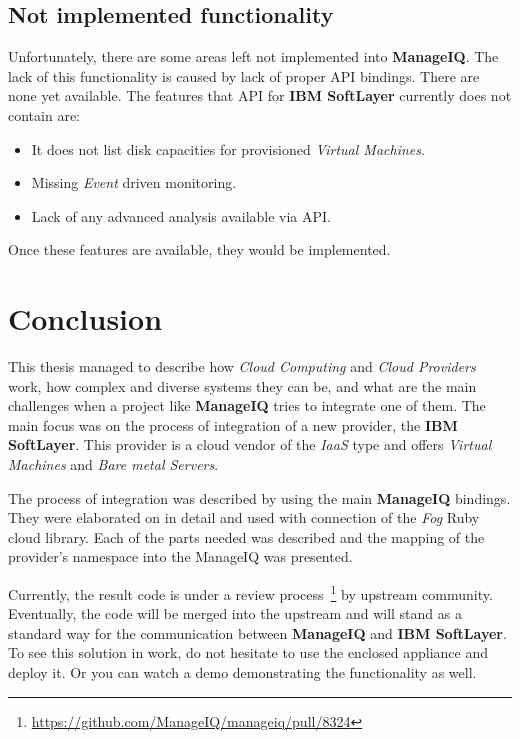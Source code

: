 \section{Not implemented functionality}
\label{sec:Not implemented functionality}

Unfortunately, there are some areas left not implemented into \textbf{ManageIQ}. The lack of this functionality is caused by lack of proper API bindings. There are none yet available. The features that API for \textbf{IBM SoftLayer} currently does not contain are:

\begin{itemize}
	\item It does not list disk capacities for provisioned \emph{Virtual Machines}.
	\item Missing \emph{Event} driven monitoring.
	\item Lack of any advanced analysis available via API.\@
\end{itemize}

Once these features are available, they would be implemented.

\chapter{Conclusion}
\label{chap:Conclusion}

This thesis managed to describe how \emph{Cloud Computing} and \emph{Cloud Providers} work, how complex and diverse systems they can be, and what are the main challenges when a project like \textbf{ManageIQ} tries to integrate one of them. The main focus was on the process of integration of a new provider, the \textbf{IBM SoftLayer}. This provider is a cloud vendor of the \emph{IaaS} type and offers \emph{Virtual Machines} and \emph{Bare metal Servers}.

The process of integration was described by using the main \textbf{ManageIQ} bindings. They were elaborated on in detail and used with connection of the \emph{Fog} Ruby cloud library. Each of the parts needed was described and the mapping of the provider's namespace into the {ManageIQ} was presented.

Currently, the result code is under a review process~\footnote{\url{https://github.com/ManageIQ/manageiq/pull/8324}} by upstream community. Eventually, the code will be merged into the upstream and will stand as a standard way for the communication between \textbf{ManageIQ} and \textbf{IBM SoftLayer}. To see this solution in work, do not hesitate to use the enclosed appliance and deploy it. Or you can watch a demo demonstrating the functionality as well.
